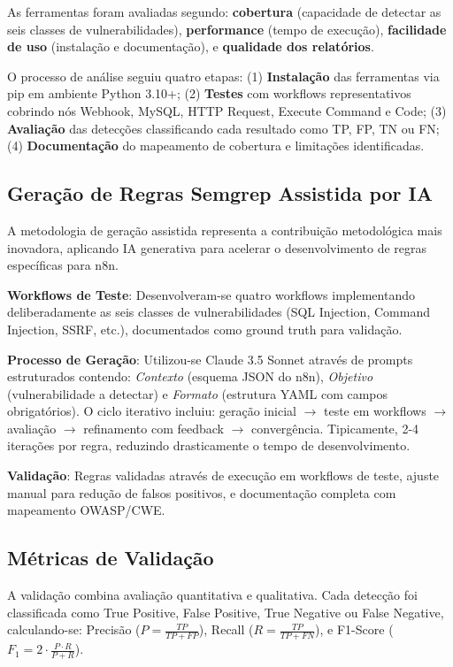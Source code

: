 \documentclass[12pt,a4paper]{article}
\begin{document}
As ferramentas foram avaliadas segundo: \textbf{cobertura} (capacidade de detectar as seis classes de vulnerabilidades), \textbf{performance} (tempo de execução), \textbf{facilidade de uso} (instalação e documentação), e \textbf{qualidade dos relatórios}.

O processo de análise seguiu quatro etapas: (1) \textbf{Instalação} das ferramentas via pip em ambiente Python 3.10+; (2) \textbf{Testes} com workflows representativos cobrindo nós Webhook, MySQL, HTTP Request, Execute Command e Code; (3) \textbf{Avaliação} das detecções classificando cada resultado como TP, FP, TN ou FN; (4) \textbf{Documentação} do mapeamento de cobertura e limitações identificadas.

\subsection{Geração de Regras Semgrep Assistida por IA}

A metodologia de geração assistida representa a contribuição metodológica mais inovadora, aplicando IA generativa para acelerar o desenvolvimento de regras específicas para n8n.

\textbf{Workflows de Teste}: Desenvolveram-se quatro workflows implementando deliberadamente as seis classes de vulnerabilidades (SQL Injection, Command Injection, SSRF, etc.), documentados como ground truth para validação.

\textbf{Processo de Geração}: Utilizou-se Claude 3.5 Sonnet através de prompts estruturados contendo: \textit{Contexto} (esquema JSON do n8n), \textit{Objetivo} (vulnerabilidade a detectar) e \textit{Formato} (estrutura YAML com campos obrigatórios). O ciclo iterativo incluiu: geração inicial $\rightarrow$ teste em workflows $\rightarrow$ avaliação $\rightarrow$ refinamento com feedback $\rightarrow$ convergência. Tipicamente, 2-4 iterações por regra, reduzindo drasticamente o tempo de desenvolvimento.

\textbf{Validação}: Regras validadas através de execução em workflows de teste, ajuste manual para redução de falsos positivos, e documentação completa com mapeamento OWASP/CWE.

\subsection{Métricas de Validação}

A validação combina avaliação quantitativa e qualitativa. Cada detecção foi classificada como True Positive, False Positive, True Negative ou False Negative, calculando-se: Precisão ($P = \frac{TP}{TP + FP}$), Recall ($R = \frac{TP}{TP + FN}$), e F1-Score ($F_1 = 2 \cdot \frac{P \cdot R}{P + R}$).
\end{document}

